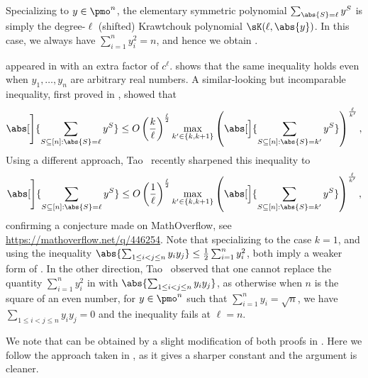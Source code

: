 Specializing to $y \in \pmo^n$, the elementary symmetric polynomial $\sum_{\abs{S}=\ell} y^S$ is simply the degree-$\ell$ (shifted) Krawtchouk polynomial $\sK(\ell,\abs{y})$.
In this case, we always have $\sum_{i=1}^n y_i^2 = n$, and hence we obtain .

 appeared in \cite{BIJLSV21}
with an extra factor of $c^\ell$.   shows that the same inequality holds even when $y_1, \ldots, y_n$ are arbitrary real numbers.
A similar-looking but incomparable inequality, first proved in \cite{GY20}, showed that
\begin{align} \label{eq:GY-ineq}
  \abs[\Bigg]{ \sum_{S \subseteq [n]: \abs{S}=\ell} y^S }
  \le O\left(\frac{k}{\ell}\right)^{\frac{\ell}{2}} \max_{k'\in\{k,k+1\}} \left(\abs[\Big]{\sum_{S \subseteq [n]: \abs{S}=k'} y^S } \right)^{\frac{\ell}{k'}} ,
\end{align}
Using a different approach, Tao~\cite{Tao23-Maclaurin} recently sharpened this inequality to
\begin{align} \label{eq:Tao-ineq}
  \abs[\Bigg]{ \sum_{S \subseteq [n]: \abs{S}=\ell} y^S }
\le O\left(\frac{1}{\ell}\right)^{\frac{\ell}{2}} \max_{k'\in\{k,k+1\}} \left(\abs[\Big]{\sum_{S \subseteq [n]: \abs{S}=k'} y^S } \right)^{\frac{\ell}{k'}} ,
\end{align}
confirming a conjecture made on MathOverflow, see \url{https://mathoverflow.net/q/446254}.
Note that specializing to the case $k=1$, and using the inequality $\abs{\sum_{1\le i < j \le n} y_i y_j} \le \frac{1}{2}\sum_{i=1}^n y_i^2$, both  imply a weaker form of .
In the other direction, Tao~\cite{Tao23-private} observed that one cannot replace the quantity $\sum_{i=1}^n y_i^2$ in  with $\abs{\sum_{1\le i < j \le n} y_i y_j}$, as otherwise when $n$ is the square of an even number, for $y \in \pmo^n$ such that $\sum_{i=1}^n y_i = \sqrt{n}$, we have $\sum_{1 \le i < j \le n} y_i y_j = 0$ and the inequality fails at $\ell = n$.

We note that  can be obtained by a slight modification of both proofs in \cite{GY20,Tao23-Maclaurin}.
Here we follow the approach taken in \cite{Tao23-Maclaurin}, as it gives a sharper constant and the argument is cleaner.

